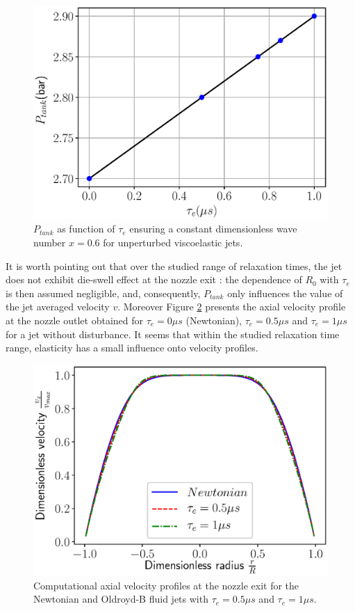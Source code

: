 \documentclass[onecolumn, 12pt]{asme2ej}
\begin{document}
\begin{figure}[H]
    \centering
    \includegraphics[width=15cm]{Figures/Fig12.eps}
    \caption{$P_{tank}$ as function of $\tau_e$ ensuring a constant dimensionless wave number $x = 0.6$ for unperturbed viscoelastic jets.}
    \label{fig:dP}
\end{figure}

It is worth pointing out that over the studied range of relaxation times, the jet does not exhibit die-swell effect at the nozzle exit : the dependence of $R_0$ with $\tau_e$ is then assumed negligible, and, consequently, $P_{tank}$ only influences the value of the jet averaged velocity $v$. Moreover Figure \ref{fig:vProfiles} presents the axial velocity profile at the nozzle outlet obtained for $\tau_e = 0\mu s$ (Newtonian), $\tau_e = 0.5\mu s$ and $\tau_e = 1\mu s$ for a jet without disturbance. It seems that within the studied relaxation time range, elasticity has a small influence onto velocity profiles.

\begin{figure}[H]
    \centering
    \includegraphics[width=15cm]{Figures/Fig13.eps}
    \caption{Computational axial velocity profiles at the nozzle exit for the Newtonian and Oldroyd-B fluid jets with $\tau_e = 0.5\mu s$ and $\tau_e = 1\mu s$.}
    \label{fig:vProfiles}
\end{figure}
\end{document}
